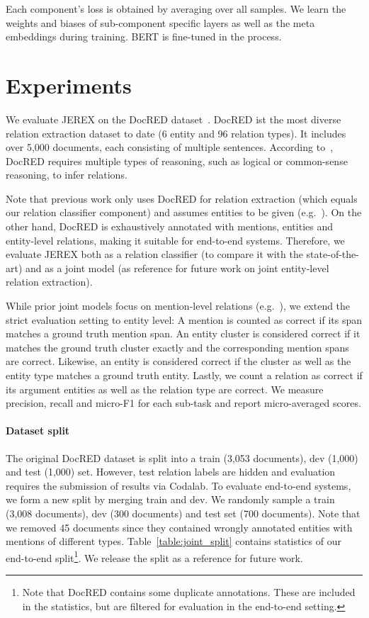 \documentclass[11pt,a4paper]{article}
\newcommand\name{JEREX}
\begin{document}
Each component's loss is obtained by averaging over all samples. We learn the weights and biases of sub-component specific layers as well as the meta embeddings during training. BERT is fine-tuned in the process.

\section{Experiments} \label{sec:experiments}

We evaluate \name{} on the DocRED dataset~\cite{yao:2019:docred}. DocRED ist the most diverse relation extraction dataset to date (6 entity and 96 relation types). It includes over 5,000 documents, each consisting of multiple sentences. According to~\citet{yao:2019:docred}, DocRED requires multiple types of reasoning, such as logical or common-sense reasoning, to infer relations. 

Note that previous work only uses DocRED for relation extraction (which equals our relation classifier component) and assumes entities to be given (e.g.~\citealt{wang:2019:two-step-bert, nan:2020:bert_lsr}). On the other hand, DocRED is exhaustively annotated with mentions, entities and entity-level relations, making it suitable for end-to-end systems. 
Therefore, we evaluate \name{} both as a relation classifier (to compare it with the state-of-the-art) and as a joint model (as reference for future work on joint entity-level relation extraction).  

While prior joint models focus on mention-level relations (e.g.~\citealt{gupta:2016:table_filling, bekoulis:2018:multi_head, chi:2019:hierarch_attention}), we extend the strict evaluation setting to entity level: A mention is counted as correct if its span matches a ground truth mention span. An entity cluster is considered correct if it matches the ground truth cluster exactly and the corresponding mention spans are correct. Likewise, an entity is considered correct if the cluster as well as the entity type matches a ground truth entity. Lastly, we count a relation as correct if its argument entities as well as the relation type are correct. We measure precision, recall and micro-F1 for each sub-task and report micro-averaged scores.

\paragraph{Dataset split} The original DocRED dataset is split into a train (3,053 documents), dev (1,000) and test (1,000) set. However, test relation labels are hidden and evaluation requires the submission of results via Codalab. To evaluate end-to-end systems, we form a new split by merging train and dev. We randomly sample a train (3,008 documents), dev (300 documents) and test set (700 documents). Note that we removed 45 documents since they contained wrongly annotated entities with mentions of different types. Table~\ref{table:joint_split} contains statistics of our end-to-end split\footnote{Note that DocRED contains some duplicate annotations. These are included in the statistics, but are filtered for evaluation in the end-to-end setting.}. We release the split as a reference for future work.
\end{document}
